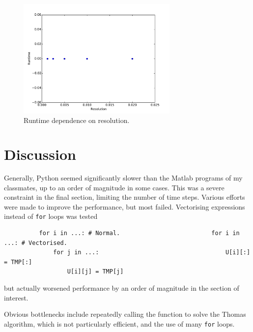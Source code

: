 \documentclass{article}
\begin{document}
\begin{figure}
  \centering
  \includegraphics[width=0.7\textwidth]{2/4/resolution.pdf}
  \caption{Runtime dependence on resolution.}
  \label{f:42}
\end{figure}

\section*{Discussion}
Generally, Python seemed significantly slower than the Matlab programs of my classmates, up to an order
of magnitude in some cases. This was a severe constraint in the final section, limiting the number of time
steps.
Various efforts were made to improve the performance, but most failed. Vectorising expressions instead of \verb+for+
loops was tested
\begin{verbatim}
          for i in ...: # Normal.                          for i in ...: # Vectorised.
              for j in ...:                                    U[i][:] = TMP[:]
                  U[i][j] = TMP[j]
\end{verbatim}
but actually worsened performance by an order of magnitude in the section of interest.

Obvious bottlenecks include repeatedly calling the function to solve the Thomas algorithm, which
is not particularly efficient, and the use of many \verb+for+ loops.
\end{document}
